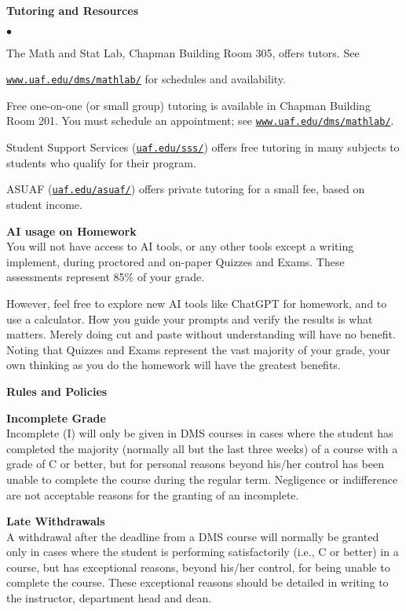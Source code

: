 \documentclass[12pt]{article}
\renewcommand{\emph}[1]{\textsf{\textbf{#1}}}
\newcommand{\localhead}[1]{\par\smallskip\textbf{#1} \smallskip\nobreak\\}%
\def\heading#1{\localhead{\large\emph{#1}}}
\def\subheading#1{\localhead{\emph{#1}}}
\newenvironment{clist}%
{\bgroup\parskip 0pt\begin{list}{$\bullet$}{\partopsep 4pt\topsep 0pt\itemsep -2pt}}%
{\end{list}\egroup}%
\begin{document}
\heading{Tutoring and Resources}
\vskip -30pt\strut
\begin{clist}
    \item The Math and Stat Lab, Chapman Building Room 305, offers tutors. 
	See 

	\href{http://www.uaf.edu/dms/mathlab/}{\texttt{www.uaf.edu/dms/mathlab/}} for schedules and availability.
	\item Free
one-on-one (or small group) tutoring is available in 
Chapman Building Room 201. You must schedule an
appointment; see \href{http://www.uaf.edu/dms/mathlab/}{\texttt{www.uaf.edu/dms/mathlab/}}.
	\item Student Support Services (\href{https://uaf.edu/sss/}{\texttt{uaf.edu/sss/}}) offers free tutoring in many subjects to students who qualify for their program.
	\item ASUAF (\href{https://uaf.edu/asuaf/}{\texttt{uaf.edu/asuaf/}}) offers private tutoring for a small fee, based on student income.
\end{clist}


\clearpage\newpage

\strut

\vspace{-12pt}

\heading{AI usage on Homework}
You will not have access to AI tools, or any other tools except a writing implement, during proctored and on-paper Quizzes and Exams.  These assessments represent 85\% of your grade.

However, feel free to explore new AI tools like ChatGPT for homework, and to use a calculator.  How you guide your prompts and verify the results is what matters.  Merely doing cut and paste without understanding will have no benefit.  Noting that Quizzes and Exams represent the vast majority of your grade, your own thinking as you do the homework will have the greatest benefits.


\heading{Rules and Policies}
\vskip -20pt

\subheading{Incomplete Grade} 
Incomplete (I) will only be given in
  DMS courses in cases where
  the student has completed the majority (normally all but the last
  three weeks) of a course with a grade of C or better, but for
  personal reasons beyond his/her control has been unable to complete
  the course during the regular term. Negligence or indifference are
  not acceptable reasons for the granting of an incomplete. 

\subheading{Late Withdrawals} 
A withdrawal after the deadline from a DMS course will
  normally be granted only in cases where the student is performing
  satisfactorily (i.e., C or better) in a course, but has exceptional
  reasons, beyond his/her control, for being unable to complete the
  course. These exceptional reasons should be detailed in writing to
  the instructor, department head and dean.
\end{document}

